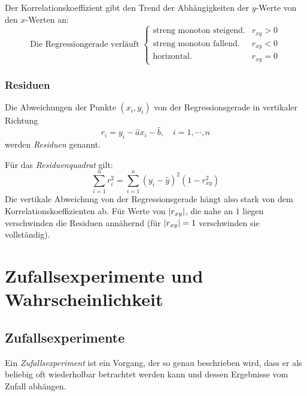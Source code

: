            	Der Korrelationskoeffizient gibt den Trend der Abhängigkeiten der \(y\)-Werte von den \(x\)-Werten an:
           	\begin{equation*}
               	\text{Die Regressiongerade verläuft }
               	\begin{cases}
               		\textrm{streng monoton steigend.} & r_{xy} > 0 \\
               		\textrm{streng monoton fallend.}  & r_{xy} < 0 \\
               		\textrm{horizontal.}              & r_{xy} = 0
               	\end{cases}
           	\end{equation*}
           	
           	\subsubsection{Residuen}
               	Die Abweichungen der Punkte \( (x_i, y_i) \) von der Regressionsgerade in vertikaler Richtung
               	\begin{equation*}
	               	r_i = y_i - \hat{a} x_i - \hat{b}, \quad i = 1, \cdots, n
               	\end{equation*}
               	werden \textit{Residuen} genannt.
               	
               	Für das \textit{Residuenquadrat} gilt:
               	\begin{equation*}
	               	\sum_{i = 1}^{n} r_i^2 = \sum_{i = 1}^{n} (y_i - \hat{y})^2 (1 - r_{xy}^2)
               	\end{equation*}
               	Die vertikale Abweichung von der Regressionsgerade hängt also stark von dem Korrelationskoeffizienten ab. Für Werte von \( \abs{r_{xy}} \), die nahe an \(1\) liegen verschwinden die Residuen annähernd (für \( \abs{r_{xy}} = 1 \) verschwinden sie vollständig).

    \section{Zufallsexperimente und Wahrscheinlichkeit}
        \subsection{Zufallsexperimente}
            Ein \textit{Zufallsexperiment} ist ein Vorgang, der so genau beschrieben wird, dass er als beliebig oft wiederholbar betrachtet werden kann und dessen Ergebnisse vom Zufall abhängen.
            
